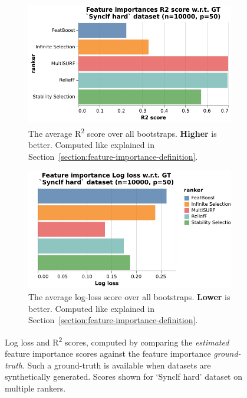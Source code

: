 \documentclass[../main.tex]{subfiles}
\begin{document}
\begin{figure}[ht]
     \centering
     \begin{subfigure}[b]{0.49\textwidth}
        \centering
        \includegraphics[width=\linewidth]{report/images/results-r2-score-various-rankers.pdf}
        \caption{The average R\textsuperscript{2} score over all bootstraps. \textbf{Higher} is better. Computed like explained in Section~\ref{section:feature-importance-definition}.}
        \label{fig:results-r2-score-various-rankers}
     \end{subfigure}
     \hfill
     \begin{subfigure}[b]{0.49\textwidth}
        \centering
        \includegraphics[width=\linewidth]{report/images/results-log-loss-various-rankers.pdf}
        \caption{The average log-loss score over all bootstraps. \textbf{Lower} is better. Computed like explained in Section~\ref{section:feature-importance-definition}.}
        \label{fig:results-log-loss-various-rankers}
     \end{subfigure}
     
    \caption{Log loss and R\textsuperscript{2} scores, computed by comparing the \textit{estimated} feature importance scores against the feature importance \textit{ground-truth}. Such a ground-truth is available when datasets are synthetically generated. Scores shown for `Synclf hard' dataset on multiple rankers.}
    \label{fig:results-ground-truth-various-rankers}
\end{figure}
\end{document}
